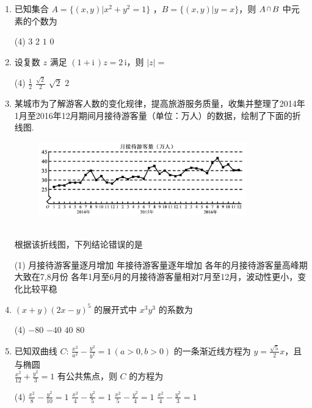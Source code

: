 \documentclass[12pt,space]{ctexart} %
\begin{document}
\begin{enumerate}[itemsep=0.2em,topsep=0pt]
\item 已知集合 $A=\{(x,y)|x^2+y^2=1\}$ ，$B=\{(x,y)|y=x\}$，则 $A{\,\raisebox{0.8mm}{\scaleobj{0.55}{\bigcap}}\,}B$ 中元素的个数为
\begin{tasks}(4)
	\task $3$ \task $2$ \task $1$ \task $0$ 
\end{tasks}
\item 设复数 $z$ 满足 $(1+\mathrm{i}\,)z=2\,\mathrm{i}$，则 $|z|=$
\begin{tasks}(4)
	\task $\frac{1}{2}$ \task $\frac{\sqrt{2}}{2}$ \task $\sqrt{2}$ \task $2$
\end{tasks}
\item 某城市为了解游客人数的变化规律，提高旅游服务质量，收集并整理了2014年1月至2016年12月期间月接待游客量（单位：万人）的数据，绘制了下面的折线图.\\[-2.5em]
\begin{figure}[htbp]
\centering
\includegraphics[width=0.85\textwidth]{Image/iii-3.jpg}
\end{figure}\\[-1.5em]
根据该折线图，下列结论错误的是
\begin{tasks}(1)
	\task 月接待游客量逐月增加 
	\task 年接待游客量逐年增加
	\task 各年的月接待游客量高峰期大致在7,8月份 
	\task 各年1月至6月的月接待游客量相对7月至12月，波动性更小，变化比较平稳 
\end{tasks}

  \item $(x+y)(2x-y)^5$ 的展开式中 $x^3y^3$ 的系数为 
    \begin{tasks}(4)
      \task $-80$ \task $-40$ \task $40$ \task $80$ 
    \end{tasks}

	\item 已知双曲线 $\displaystyle{C\colon\,\frac{x^2}{a^2}-\frac{y^2}{b^2}=1\,(a>0,b>0)}$ 的一条渐近线方程为 $\displaystyle{y=\frac{\sqrt{5}}{2}x}$，且与椭圆\\
	  $\displaystyle{\frac{x^2}{12}+\frac{y^2}{3}=1}$ 有公共焦点，则 $C$ 的方程为
		\begin{tasks}(4)
			\task $\frac{x^2}{8}-\frac{y^2}{10}=1$ \task $\frac{x^2}{4}-\frac{y^2}{5}=1$ \task $\frac{x^2}{5}-\frac{y^2}{4}=1$ \task $\frac{x^2}{4}-\frac{y^2}{3}=1$ 
		\end{tasks}


\end{enumerate}
\end{document}
